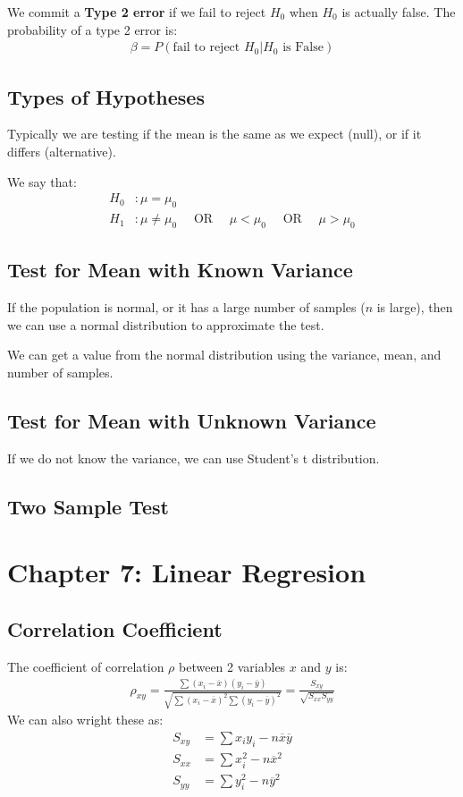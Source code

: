 \documentclass[12pt,letterpaper]{article} \usepackage{amsmath} \usepackage{graphicx} \usepackage[margin=1in]{geometry} \usepackage{longtable}  \usepackage{amssymb}
\begin{document}
	We commit a \textbf{Type 2 error} if we fail to reject $H_0$ when $H_0$ is actually false. The probability of a type 2 error is:
	\begin{align*}
		\beta= P(\text{fail to reject }H_0| H_0 \text{ is False})
	\end{align*}
	
	\subsection{Types of Hypotheses}
	Typically we are testing if the mean is the same as we expect (null), or if it differs (alternative).
	
	We say that:
	\begin{align*}
		H_0&: \mu = \mu_0 \\
		H_1&: \mu \ne \mu_0 \quad \text{ OR } \quad \mu<\mu_0 \quad \text{ OR }\quad \mu>\mu_0
	\end{align*}
	
	\subsection{Test for Mean with Known Variance}
	If the population is normal, or it has a large number of samples ($n$ is large), then we can use a normal distribution to approximate the test. 
	
	We can get a value from the normal distribution using the variance, mean, and number of samples. 
	
	\subsection{Test for Mean with Unknown Variance}
	If we do not know the variance, we can use Student's t distribution.
	
	\subsection{Two Sample Test}
	
	\section{Chapter 7: Linear Regresion}
	
	\subsection{Correlation Coefficient}
	The coefficient of correlation $\rho$ between 2 variables $x$ and $y$ is:
	\begin{align*}
		\rho_{xy} = \frac{\sum (x_i-\overline x)(y_i-\overline y)}{\sqrt{\sum (x_i - \overline x)^2 \sum(y_i - \overline y)^2}} = \frac{S_{xy}}{\sqrt{S_{xx}S_{yy}}}
	\end{align*}
	We can also wright these as:
	\begin{align*}
		S_{xy} &= \sum x_iy_i - n\overline x \overline y\\
		S_{xx} &= \sum x_i^2 - n\overline x ^2\\
		S_{yy} &= \sum y_i^2 - n\overline y ^2
	\end{align*}
	
\end{document}
